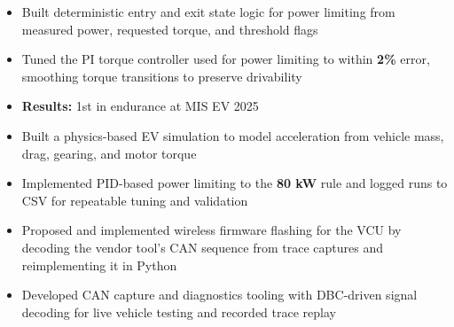 \documentclass[10pt,letterpaper]{article}
\renewcommand{\entryspace}{\vspace{0pt}}
\begin{document}
\entryspace

\orgline{\spartanracing}
\begin{itemize}
  \item Built deterministic entry and exit state logic for power limiting from measured power, requested torque, and threshold flags
  \item Tuned the PI torque controller used for power limiting to within \textbf{2\%} error, smoothing torque transitions to preserve drivability
  \item \textbf{Results:} 1st in endurance at MIS EV 2025
\end{itemize}


\orgline{\spartanracing}
\begin{itemize}
  \item Built a physics-based EV simulation to model acceleration from vehicle mass, drag, gearing, and motor torque
  \item Implemented PID-based power limiting to the \textbf{80 kW} rule and logged runs to CSV for repeatable tuning and validation
\end{itemize}

\entryspace

\begin{itemize}
  \item Proposed and implemented wireless firmware flashing for the VCU by decoding the vendor tool's CAN sequence from trace captures and reimplementing it in Python
  \item Developed CAN capture and diagnostics tooling with DBC-driven signal decoding for live vehicle testing and recorded trace replay
\end{itemize}
\end{document}
